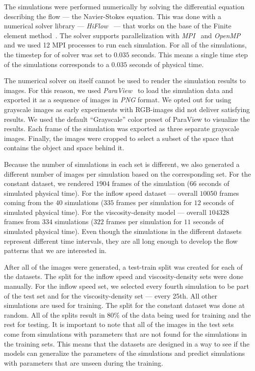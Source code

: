 \documentclass{llncs}
\begin{document}
The simulations were performed numerically by solving the differential equation describing the flow --- the Navier-Stokes equation. This was done with a numerical solver library --- \emph{HiFlow}~\cite{gawlok2017} ---  that works on the base of the Finite element method~\cite{strang2008analysis}. The solver supports parallelization with \emph{MPI}~\cite{mpi} and \emph{OpenMP}~\cite{dagum1998openmp} and we used 12 MPI processes to run each simulation. For all of the simulations, the timestep for of solver was set to $0.035$ seconds. This means a single time step of the simulations corresponds to a $0.035$ seconds of physical time.

The numerical solver on itself cannot be used to render the simulation results to images. For this reason, we used \emph{ParaView}~\cite{ahrens2005} to load the simulation data and exported it as a sequence of images in \emph{PNG} format. We opted out for using grayscale images as early experiments with RGB-images did not deliver satisfying results. We used the default ``Grayscale'' color preset of ParaView to visualize the results. Each frame of the simulation was exported as three separate grayscale images. Finally, the images were cropped to select a subset of the space that contains the object and space behind it.

Because the number of simulations in each set is different, we also generated a different number of images per simulation based on the corresponding set. For the constant dataset, we rendered $1904$ frames of the simulation ($66$ seconds of simulated physical time). For the inflow speed dataset --- overall $10050$ frames coming from the $40$ simulations ($335$ frames per simulation for $12$ seconds of simulated physical time). For the viscosity-density model --- overall $104328$ frames from $334$ simulations ($322$ frames per simulation for $11$ seconds of simulated physical time). Even though the simulations in the different datasets represent different time intervals, they are all long enough to develop the flow patterns that we are interested in.

After all of the images were generated, a test-train split was created for each of the datasets. The split for the inflow speed and viscosity-density sets were done manually. For the inflow speed set, we selected every fourth simulation to be part of the test set and for the viscosity-density set --- every 25th. All other simulations are used for training. The split for the constant dataset was done at random. All of the splits result in  80\% of the data being used for training and the rest for testing. It is important to note that all of the images in the test sets come from simulations with parameters that are not found for the simulations in the training sets. This means that the datasets are designed in a way to see if the models can generalize the parameters of the simulations and predict simulations with parameters that are unseen during the training.
\end{document}
